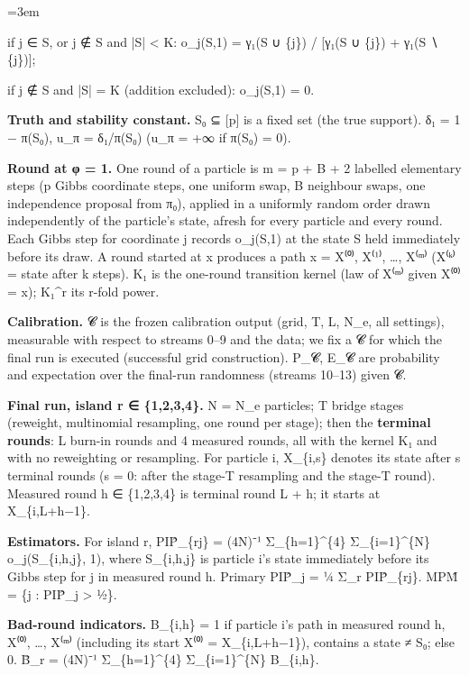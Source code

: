 \documentclass[11pt]{report}
\newenvironment{mdblock}{\begingroup\mdfont\raggedright\setlength{\parindent}{0pt}\setlength{\parskip}{0.55em}\emergencystretch=3em}{\par\endgroup}
\begin{document}
\begin{mdblock}
\begin{mdbul}
\begin{mdbul}
\item if j ∈ S, or j ∉ S and |S| < K: o\_j(S,1) = γ₁(S ∪ \{j\}) / [γ₁(S ∪ \{j\}) + γ₁(S ∖ \{j\})];
\item if j ∉ S and |S| = K (addition excluded): o\_j(S,1) = 0.
\end{mdbul}
\item \textbf{Truth and stability constant.} S₀ ⊆ [p] is a fixed set (the true support). δ₁ = 1 − π(S₀), u\_π = δ₁/π(S₀) (u\_π = +∞ if π(S₀) = 0).
\item \textbf{Round at φ = 1.} One round of a particle is m = p + B + 2 labelled elementary steps (p Gibbs coordinate steps, one uniform swap, B neighbour swaps, one independence proposal from π₀), applied in a uniformly random order drawn independently of the particle's state, afresh for every particle and every round. Each Gibbs step for coordinate j records o\_j(S,1) at the state S held immediately before its draw. A round started at x produces a path x = X⁽⁰⁾, X⁽¹⁾, …, X⁽ᵐ⁾ (X⁽ᵏ⁾ = state after k steps). K₁ is the one-round transition kernel (law of X⁽ᵐ⁾ given X⁽⁰⁾ = x); K₁\textasciicircum{}r its r-fold power.
\item \textbf{Calibration.} 𝓒 is the frozen calibration output (grid, T, L, N\_e, all settings), measurable with respect to streams 0–9 and the data; we fix a 𝓒 for which the final run is executed (successful grid construction). P\_𝓒, E\_𝓒 are probability and expectation over the final-run randomness (streams 10–13) given 𝓒.
\item \textbf{Final run, island r ∈ \{1,2,3,4\}.} N = N\_e particles; T bridge stages (reweight, multinomial resampling, one round per stage); then the \textbf{terminal rounds}: L burn-in rounds and 4 measured rounds, all with the kernel K₁ and with no reweighting or resampling. For particle i, X\_\{i,s\} denotes its state after s terminal rounds (s = 0: after the stage-T resampling and the stage-T round). Measured round h ∈ \{1,2,3,4\} is terminal round L + h; it starts at X\_\{i,L+h−1\}.
\item \textbf{Estimators.} For island r, PIP̂\_\{rj\} = (4N)⁻¹ Σ\_\{h=1\}\textasciicircum{}\{4\} Σ\_\{i=1\}\textasciicircum{}\{N\} o\_j(S\_\{i,h,j\}, 1), where S\_\{i,h,j\} is particle i's state immediately before its Gibbs step for j in measured round h. Primary PIP̂\_j = ¼ Σ\_r PIP̂\_\{rj\}. MPM̂ = \{j : PIP̂\_j > ½\}.
\item \textbf{Bad-round indicators.} B\_\{i,h\} = 1 if particle i's path in measured round h, X⁽⁰⁾, …, X⁽ᵐ⁾ (including its start X⁽⁰⁾ = X\_\{i,L+h−1\}), contains a state ≠ S₀; else 0. B̄\_r = (4N)⁻¹ Σ\_\{h=1\}\textasciicircum{}\{4\} Σ\_\{i=1\}\textasciicircum{}\{N\} B\_\{i,h\}.
\end{mdbul}


\end{mdblock}
\end{document}
